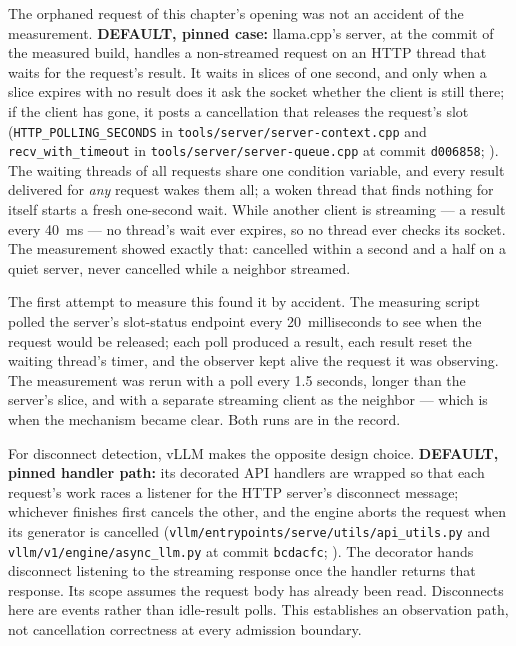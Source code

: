 The orphaned request of this chapter's opening was not an accident of the
measurement. \textbf{DEFAULT, pinned case:} llama.cpp's server, at the commit
of the measured build, handles a
non-streamed request on an HTTP thread that waits for the request's result. It
waits in slices of one second, and only when a slice expires with no result
does it ask the socket whether the client is still there; if the client has
gone, it posts a cancellation that releases the request's slot
(\texttt{HTTP\_POLLING\_SECONDS} in \texttt{tools/server/server-context.cpp}
and \texttt{recv\_with\_timeout} in \texttt{tools/server/server-queue.cpp} at
commit \texttt{d006858}; \cite{llamacpp2026cancelqueue,llamacpp2026cancelcontext}).
The waiting threads of all requests share one
condition variable, and every result delivered for \emph{any} request wakes
them all; a woken thread that finds nothing for itself starts a fresh
one-second wait. While another client is streaming --- a result every 40~ms ---
no thread's wait ever expires, so no thread ever checks its socket. The
measurement showed exactly that: cancelled within a second and a half on a
quiet server, never cancelled while a neighbor streamed.

The first attempt to measure this found it by accident. The measuring script
polled the server's slot-status endpoint every 20~milliseconds to see when the
request would be released; each poll produced a result, each result reset the
waiting thread's timer, and the observer kept alive the request it was
observing. The measurement was rerun with a poll every 1.5 seconds, longer
than the server's slice, and with a separate streaming client as the
neighbor --- which is when the mechanism became clear. Both runs are in the
record.

For disconnect detection, vLLM makes the opposite design choice.
\textbf{DEFAULT, pinned handler path:} its decorated API handlers are
wrapped so that each request's work races a listener for the HTTP server's
disconnect message; whichever finishes first cancels the other, and the
engine aborts the request when its generator is cancelled
(\texttt{vllm/entrypoints/serve/utils/api\_utils.py} and
\texttt{vllm/v1/engine/async\_llm.py} at commit \texttt{bcdacfc};
\cite{vllm2026cancelhandler,vllm2026cancelengine}).
The decorator hands disconnect listening to the streaming response once the
handler returns that response. Its scope assumes the request body has
already been read. Disconnects here are events rather than idle-result polls.
This establishes an observation path, not cancellation correctness at
every admission boundary.

